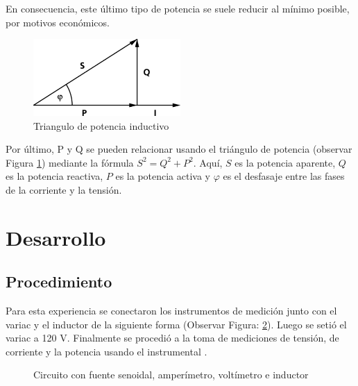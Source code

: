 \documentclass{article}
\begin{document}
        En consecuencia, este último tipo de potencia se suele reducir al mínimo posible, por motivos económicos.


        \begin{figure}[h!] %
            \centering
            \includegraphics[width=0.5\textwidth]{Trojkat-mocy.png} %
            \caption{Triangulo de potencia inductivo}
            \label{fig:triangulo_de_potencia} %
        \end{figure}
        Por último, P y Q se pueden relacionar usando el triángulo de potencia (observar Figura \ref{fig:triangulo_de_potencia}) mediante la fórmula $S^2=Q^2+P^2$. Aquí, $S$ es la potencia aparente, $Q$ es la potencia reactiva, $P$ es la potencia activa y $\varphi$ es el desfasaje entre las fases de la corriente y la tensión. 

    \indent
    \section{Desarrollo}

        \subsection{Procedimiento}

            Para esta experiencia se conectaron los instrumentos de medición junto con el variac y el inductor de la siguiente forma (Observar Figura: \ref{fig:circuito-inductor}). Luego se setió el variac a 120 V. Finalmente se procedió a la toma de mediciones de tensión, de corriente y la potencia usando el instrumental . 
            \begin{figure}[h!]
                \centering
                \caption{Circuito con fuente senoidal, amperímetro, voltímetro e inductor}
                \label{fig:circuito-inductor}
            \end{figure}
\end{document}
